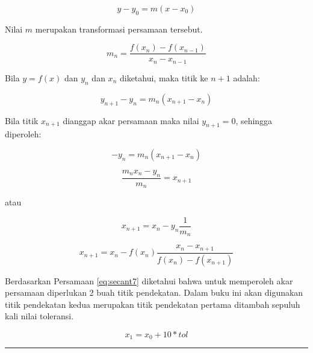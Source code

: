 \documentclass[]{book}
\theoremstyle{definition}
\theoremstyle{definition}
\theoremstyle{definition}
\theoremstyle{remark}
\begin{document}
\begin{equation}
y-y_0=m\left(x-x_0\right)
  \label{eq:secant}
\end{equation}

Nilai \(m\) merupakan transformasi persamaan tersebut.

\begin{equation}
m_n=\frac{f\left(x_n\right)-f\left(x_{n-1}\right)}{x_n-x_{n-1}}
  \label{eq:secant2}
\end{equation}

Bila \(y=f\left(x\right)\) dan \(y_n\) dan \(x_n\) diketahui, maka titik ke \(n+1\) adalah:

\begin{equation}
y_{n+1}-y_n=m_n\left(x_{n+1}-x_n\right)
  \label{eq:secant3}
\end{equation}

Bila titik \(x_{n+1}\) dianggap akar persamaan maka nilai \(y_{n+1}=0\), sehingga diperoleh:

\begin{equation}
-y_n=m_n\left(x_{n+1}-x_n\right)
  \label{eq:secant4}
\end{equation}

\begin{equation}
\frac{m_nx_n-y_n}{m_n}=x_{n+1}
  \label{eq:secant5}
\end{equation}

atau

\begin{equation}
x_{n+1}=x_n-y_n\frac{1}{m_n}
  \label{eq:secant6}
\end{equation}

\begin{equation}
x_{n+1}=x_n-f\left(x_n\right)\frac{x_n-x_{n+1}}{f\left(x_n\right)-f\left(x_{n+1}\right)}
  \label{eq:secant7}
\end{equation}

Berdasarkan Persamaan \eqref{eq:secant7} diketahui bahwa untuk memperoleh akar persamaan diperlukan 2 buah titik pendekatan. Dalam buku ini akan digunakan titik pendekatan kedua merupakan titik pendekatan pertama ditambah sepuluh kali nilai toleransi.

\begin{equation}
x_1=x_0+10*tol
  \label{eq:secant8}
\end{equation}

\begin{center}\rule{0.5\linewidth}{\linethickness}\end{center}
\end{document}
